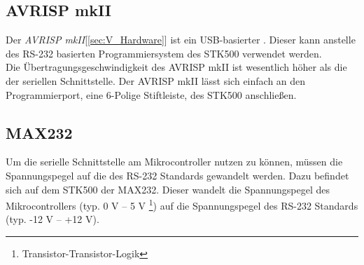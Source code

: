 \subsection{AVRISP mkII}
\label{sec:AVRISP}
Der \emph{AVRISP mkII}[\ref{sec:V_Hardware}] ist ein USB-basierter . Dieser kann anstelle des RS-232 basierten Programmiersystem des STK500 verwendet werden.\\
Die Übertragungsgeschwindigkeit des AVRISP mkII ist wesentlich höher als die der seriellen Schnittstelle. 
Der AVRISP mkII lässt sich einfach an den Programmierport, eine 6-Polige Stiftleiste, des STK500 anschließen.

\subsection{MAX232}
\label{sec:MAX232}
Um die serielle Schnittstelle am Mikrocontroller nutzen zu können, müssen die Spannungspegel auf die des RS-232 Standards gewandelt werden. Dazu befindet sich auf dem STK500 der  MAX232. 
Dieser wandelt die Spannungspegel des Mikrocontrollers (typ. 0 V -- 5 V \footnote{Transistor-Transistor-Logik}) auf die Spannungspegel des RS-232 Standards (typ. -12 V -- +12 V).
